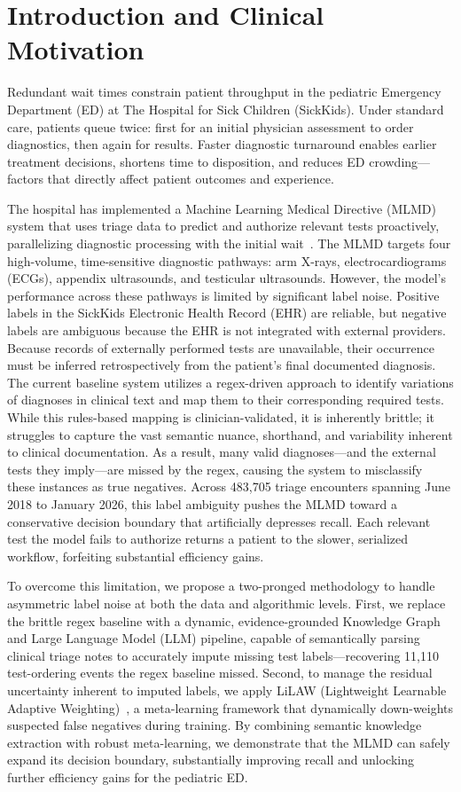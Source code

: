 \section{Introduction and Clinical Motivation}

Redundant wait times constrain patient throughput in the pediatric Emergency Department (ED) at The Hospital for Sick Children (SickKids). Under standard care, patients queue twice: first for an initial physician assessment to order diagnostics, then again for results. Faster diagnostic turnaround enables earlier treatment decisions, shortens time to disposition, and reduces ED crowding---factors that directly affect patient outcomes and experience.

The hospital has implemented a Machine Learning Medical Directive (MLMD) system that uses triage data to predict and authorize relevant tests proactively, parallelizing diagnostic processing with the initial wait~\cite{singh_assessment_2022}. The MLMD targets four high-volume, time-sensitive diagnostic pathways: arm X-rays, electrocardiograms (ECGs), appendix ultrasounds, and testicular ultrasounds. However, the model's performance across these pathways is limited by significant label noise. Positive labels in the SickKids Electronic Health Record (EHR) are reliable, but negative labels are ambiguous because the EHR is not integrated with external providers. Because records of externally performed tests are unavailable, their occurrence must be inferred retrospectively from the patient's final documented diagnosis. The current baseline system utilizes a regex-driven approach to identify variations of diagnoses in clinical text and map them to their corresponding required tests. While this rules-based mapping is clinician-validated, it is inherently brittle; it struggles to capture the vast semantic nuance, shorthand, and variability inherent to clinical documentation. As a result, many valid diagnoses---and the external tests they imply---are missed by the regex, causing the system to misclassify these instances as true negatives. Across 483,705 triage encounters spanning June 2018 to January 2026, this label ambiguity pushes the MLMD toward a conservative decision boundary that artificially depresses recall. Each relevant test the model fails to authorize returns a patient to the slower, serialized workflow, forfeiting substantial efficiency gains.

To overcome this limitation, we propose a two-pronged methodology to handle asymmetric label noise at both the data and algorithmic levels. First, we replace the brittle regex baseline with a dynamic, evidence-grounded Knowledge Graph and Large Language Model (LLM) pipeline, capable of semantically parsing clinical triage notes to accurately impute missing test labels---recovering 11,110 test-ordering events the regex baseline missed. Second, to manage the residual uncertainty inherent to imputed labels, we apply LiLAW (Lightweight Learnable Adaptive Weighting)~\cite{moturu_lilaw_2025}, a meta-learning framework that dynamically down-weights suspected false negatives during training. By combining semantic knowledge extraction with robust meta-learning, we demonstrate that the MLMD can safely expand its decision boundary, substantially improving recall and unlocking further efficiency gains for the pediatric ED.
